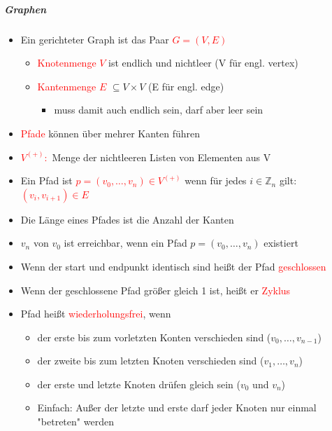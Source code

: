 \documentclass[12pt]{article}
\begin{document}
\large\subparagraph{\large Graphen}
\normalsize
\begin{flushleft}
    \vspace{0.5cm}
    \begin{itemize}
        \item Ein gerichteter Graph ist das Paar \textcolor{red}{$G = (V,E)$}
        \begin{itemize}
            \item \textcolor{red}{Knotenmenge $V$} ist endlich und nichtleer (V für engl. vertex)
            \item \textcolor{red}{Kantenmenge $E$} $\subseteq V \times V$  (E für engl. edge)
            \begin{itemize}
                \item muss damit auch endlich sein, darf aber leer sein
            \end{itemize}
        \end{itemize}
        \item \textcolor{red}{Pfade} können über mehrer Kanten führen
        \item \textcolor{red}{$V^{(+)}:$} Menge der nichtleeren Listen von Elementen aus V
        \item Ein Pfad ist \textcolor{red}{$p=(v_0,\dots ,v_n) \in V^{(+)}$} wenn für jedes $i \in \mathbb{Z}_n$ gilt: \textcolor{red}{$(v_i,v_{i+1})\in E$}
        \item Die Länge eines Pfades ist die Anzahl der Kanten
        \item $v_n$ von $v_0$ ist erreichbar, wenn ein Pfad $p = (v_0,\dots ,v_n)$ existiert
        \item Wenn der start und endpunkt identisch sind heißt der Pfad \textcolor{red}{geschlossen}
        \item Wenn der geschlossene Pfad größer gleich 1 ist, heißt er \textcolor{red}{Zyklus}
        \item Pfad heißt \textcolor{red}{wiederholungsfrei}, wenn
        \begin{itemize}
            \item der erste bis zum vorletzten Konten verschieden sind ($v_0,\dots ,v_{n-1}$)
            \item der zweite bis zum letzten Knoten verschieden sind ($v_1,\dots ,v_n$)
            \item der erste und letzte Knoten drüfen gleich sein ($v_0$ und $v_n$)
            \item Einfach: Außer der letzte und erste darf jeder Knoten nur einmal "betreten" werden

\end{itemize}
\end{itemize}
\end{flushleft}
\end{document}
